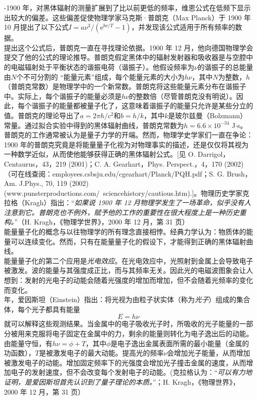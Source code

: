 	-1900 年，对黑体辐射的测量扩展到了比以前更低的频率，维恩公式在低频下显示出较大的偏差。这些偏差促使物理学家马克斯·普朗克（Max Planck）于 1900 年 10 月提出了以下公式$I=a \nu^3 / \left(\text{e}^{b\nu / T}-1\right)$，并发现该公式适用于所有频率的数据。\\
	\indent 提出这个公式后，普朗克一直在寻找理论依据。1900 年 12 月，他向德国物理学会提交了他的公式的理论推导。普朗克假定黑体中的辐射发射器和吸收器是与空腔中的电磁辐射处于平衡状态的谐振电荷（谐振子）。他假设频率为$\nu$的谐振子的总能量由$N$个不可分割的 “能量元素”组成，每个能量元素的大小为$h\nu$，其中$N$为整数，$h$（普朗克常数）是物理学中的一个新常数。普朗克将这些能量元素分布在谐振子中。实际上，每个谐振子的能量必须是$h\nu$的整数倍（尽管普朗克没有明说）。因此，每个谐振子的能量都被量子化了，这意味着谐振子的能量只允许是某些分立的值。普朗克的理论导出了$a=2 \pi  h/c^2$和$b=h/k$，其中$k$是玻尔兹曼（Bolzmann）常量。通过拟合实验中得到的黑体辐射曲线，普朗克常数为$h=6.6 \times 10^{-34}$ J$\cdot$s。\\
	\indent 普朗克的工作通常被认为是量子力学的开端。然而，物理学史学家们一直在争论：1900 年的普朗克究竟是将能量量子化视为对物理事实的描述，还是仅仅将其视为一种数学近似，从而使他能够获得正确的黑体辐射公式。[见 O. Darrigol，Centaurus，43，219 (2001)；C. A. Gearhart，Phys. Perspect.，4，170 (2002)（可在线查阅：employees.csbsju.edu/cgearhart/Planck/PQH.pdf；S. G. Brush，Am. J.Phys., 70, 119 (2002) (www.punsterproductions.com/~sciencehistory/cautious.htm).]。物理历史学家克拉格（Kragh）指出：“\textit{如果说 1900 年 12 月物理学发生了一场革命，似乎没有人注意到它。普朗克也不例外，赋予他的工作的重要性在很大程度上是一种历史重构。}”（H. Kragh，《物理学世界》，2000 年 12 月，第 31 页）\\
	\indent 能量量子化的概念与以往物理学的所有理念直接相悖。经典力学认为：物质体的能量可以连续变化。然而，只有在能量量子化的假设下，才能得到正确的黑体辐射曲线。\\
	\indent 能量量子化的第二个应用是\textit{光电效应}。在光电效应中，光照射到金属上会导致电子被激发。波的能量与其强度成正比，而与其频率无关。因此光的电磁波图象会让人想到：发射的光电子的动能会随着光强度的增加而增加，但不会随着光频率的变化而变化。\\
	 年，爱因斯坦（Einstein）指出：将光视为由粒子状实体（称为\textit{光子}）组成的集合体，每个光子都具有能量
	\begin{equation}
		\boxed{E=h\nu}
		\label{eq:1.3 photoelectric effect equation}
	\end{equation}
	就可以解释这些观测结果。当金属中的电子吸收光子时，所吸收的光子能量的一部分被用来克服将电子固定在金属中的力，剩余的能量则转化为电子逸出后的动能。由能量守恒，有$h\nu = \phi+ T$，其中$\phi$是电子逸出金属表面所需的最小能量（金属的功函数），$T$是被激发电子的最大动能。提高光的频率$\nu$会增加光子能量，从而增加被激发电子的动能。增加固定频率下的光强度会增加光子撞击金属的速度，从而增加电子的发射速度，但不会改变每个发射电子的动能。(克拉格认为：“\textit{可以有力地证明，是爱因斯坦首先认识到了量子理论的本质。}”；H. Kragh，《物理世界》，2000 年 12 月，第 31 页）\\
